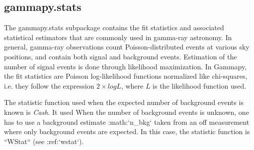 \subsection{gammapy.stats}
\label{ssec:gammapy-stats}


The gammapy.stats subpackage contains the fit statistics and associated statistical estimators
that are commonly used in gamma-ray astronomy.
In general, gamma-ray observations count Poisson-distributed events at various sky positions,
and contain both signal and background events. Estimation of the number of signal events is done
through likelihood maximization. In Gammapy, the fit statistics are Poisson log-likelihood functions
normalized like chi-squares, i.e. they follow the expression $2 \times log L$, where $L$ is the
likelihood function used.

The statistic function used when the expected number of background events is known
is \emph{Cash}. It used When the number of background events is unknown, one has to
use a background estimate :math:`n_{bkg}` taken from an off measurement where only background events
are expected. In this case, the statistic function is ``WStat`` (see :ref:`wstat`).